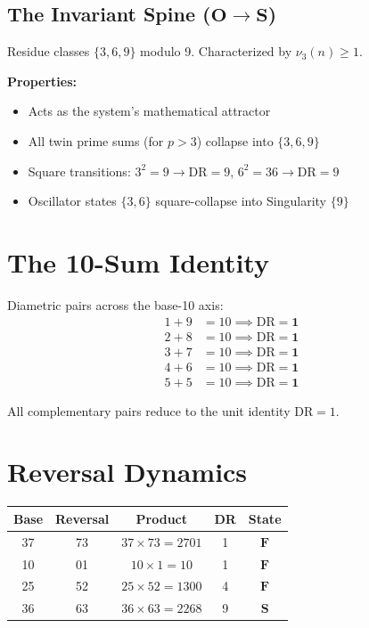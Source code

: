 \documentclass[11pt,a4paper]{article}
\begin{document}
\subsection{The Invariant Spine ($\mathbf{O} \to \mathbf{S}$)}

Residue classes $\{3, 6, 9\}$ modulo 9. Characterized by $\nu_3(n) \geq 1$.

\textbf{Properties:}
\begin{itemize}
    \item Acts as the system's mathematical attractor
    \item All twin prime sums (for $p > 3$) collapse into $\{3, 6, 9\}$
    \item Square transitions: $3^2 = 9 \to \text{DR} = 9$, $6^2 = 36 \to \text{DR} = 9$
    \item Oscillator states $\{3, 6\}$ square-collapse into Singularity $\{9\}$
\end{itemize}

\section{The 10-Sum Identity}

Diametric pairs across the base-10 axis:
\begin{align}
1 + 9 &= 10 \implies \text{DR} = \mathbf{1} \\
2 + 8 &= 10 \implies \text{DR} = \mathbf{1} \\
3 + 7 &= 10 \implies \text{DR} = \mathbf{1} \\
4 + 6 &= 10 \implies \text{DR} = \mathbf{1} \\
5 + 5 &= 10 \implies \text{DR} = \mathbf{1}
\end{align}

All complementary pairs reduce to the unit identity $\text{DR} = 1$.

\section{Reversal Dynamics}

\begin{center}
\begin{tabular}{ccccc}
\toprule
Base & Reversal & Product & DR & State \\
\midrule
37 & 73 & $37 \times 73 = 2701$ & 1 & $\mathbf{F}$ \\
10 & 01 & $10 \times 1 = 10$ & 1 & $\mathbf{F}$ \\
25 & 52 & $25 \times 52 = 1300$ & 4 & $\mathbf{F}$ \\
36 & 63 & $36 \times 63 = 2268$ & 9 & $\mathbf{S}$ \\
\bottomrule
\end{tabular}
\end{center}
\end{document}

